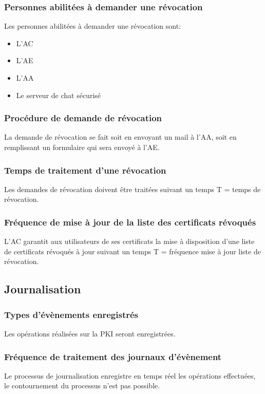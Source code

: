 \documentclass[a4paper,11pt,french]{article}
\begin{document}
\subsubsection{Personnes abilitées à demander une révocation}
Les personnes abilitées à demander une révocation sont:
\begin{itemize}
\item L'AC
\item L'AE
\item L'AA
\item Le serveur de chat sécurisé
\end{itemize}

\subsubsection{Procédure de demande de révocation}
La demande de révocation se fait soit
en envoyant un mail à l'AA, soit en remplissant un formulaire qui sera envoyé à l'AE.

\subsubsection{Temps de traitement d'une révocation}
Les demandes de révocation doivent être traitées suivant un temps T = temps de révocation.

\subsubsection{Fréquence de mise à jour de la liste des certificats révoqués}
L'AC garantit aux utilisateurs de ses certificats la mise à disposition d'une liste de certificats révoqués à jour
suivant un temps T = fréquence mise à jour liste de révocation.

\subsection{Journalisation}
\subsubsection{Types d'évènements enregistrés}
Les opérations réalisées sur la PKI seront enregistrées.

\subsubsection{Fréquence de traitement des journaux d'évènement}
Le processus de journalisation enregistre en temps réel les opérations effectuées, le contournement du processus n'est pas possible.
\end{document}
